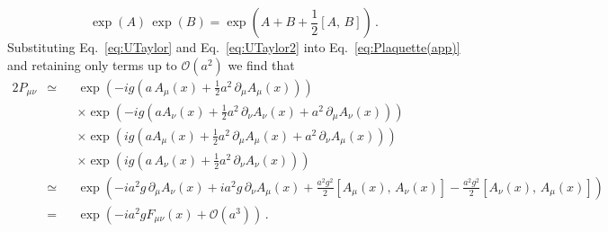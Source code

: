 %
\begin{equation}
\exp(A)\,\exp(B) = \exp\left(A + B +\frac{1}{2}[A,\,B]\right)\, .
\label{eq:BCH}
\end{equation}
%
Substituting Eq.~\eqref{eq:UTaylor} and Eq.~\eqref{eq:UTaylor2} into Eq.~\eqref{eq:Plaquette(app)} and retaining only terms up to $\mathcal{O}(a^2)$ we find that
%
\begin{alignat}{2}
P_{\mu\nu} &\simeq &&\exp\left(-ig\left(a\,A_\mu(x)+\frac{1}{2}a^2\,\partial_\mu A_\mu(x) \right)\right)\nonumber\\
& &&\times\exp\left(-ig\left(aA_\nu(x) + \frac{1}{2}a^2\,\partial_\nu A_\nu(x) + a^2\,\partial_\mu A_\nu(x)\right)\right)\nonumber\\
& &&\times\exp\left(ig\left(aA_\mu(x) + \frac{1}{2}a^2\,\partial_\mu A_\mu(x) + a^2\,\partial_\nu A_\mu(x)\right)\right)\nonumber\\
& &&\times\exp\left(ig\left(a\,A_\nu(x)+\frac{1}{2}a^2\,\partial_\nu A_\nu(x)\right)\right)\nonumber\\
&\simeq &&\exp\left(-ia^2g\,\partial_\mu A_\nu(x) + ia^2g\,\partial_\nu A_\mu(x) +\frac{a^2g^2}{2}[A_\mu(x),\,A_\nu(x)] - \frac{a^2g^2}{2}[A_\nu(x),\,A_\mu(x)]\right)\nonumber\\
&= &&\exp\left(-ia^2g F_{\mu\nu}(x) + \mathcal{O}(a^3)\right)\, .
\label{eq:PlaquetteExponantial(app)}
\end{alignat}
